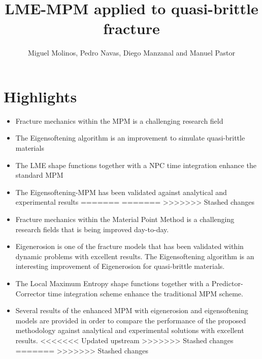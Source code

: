 \documentclass[12pt,a4paper]{article}
\title{LME-MPM applied to quasi-brittle fracture}
\author{Miguel Molinos, Pedro Navas, Diego Manzanal and Manuel Pastor}
\begin{document}
\maketitle

\centering
\section*{Highlights}
\setlength{\parskip}{1cm plus 5mm minus 4mm}
\begin{itemize}
<<<<<<< Updated upstream
<<<<<<< Updated upstream
\item Fracture mechanics within the MPM is a challenging research field

\item The Eigensoftening algorithm is an improvement to simulate quasi-brittle materials

\item The LME shape functions together with a NPC time integration enhance the standard MPM

\item The Eigensoftening-MPM has been validated against analytical and experimental results
=======
=======
>>>>>>> Stashed changes
\item Fracture mechanics within the Material Point Method is a challenging research fields that is being improved day-to-day.

\item Eigenerosion is one of the fracture models that has been validated within dynamic problems with excellent results. The Eigensoftening algorithm is an interesting improvement of Eigenerosion for quasi-brittle materials.

\item The Local Maximum Entropy shape functions together with a Predictor-Corrector time integration scheme enhance the traditional MPM scheme.

\item Several results of the enhanced MPM with eigenerosion and eigensoftening models are provided in order to compare the performance of the proposed methodology against analytical and experimental solutions with excellent results.
<<<<<<< Updated upstream
>>>>>>> Stashed changes
=======
>>>>>>> Stashed changes

\end{itemize}
\end{document}
